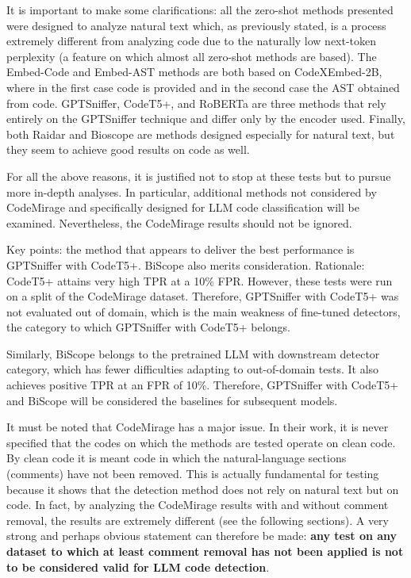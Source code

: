 It is important to make some clarifications: all the zero-shot 
methods presented were designed to analyze natural text which, 
as previously stated, is a process extremely different from 
analyzing code due to the naturally low next-token perplexity 
(a feature on which almost all zero-shot methods are based). 
The Embed-Code and Embed-AST methods are both based on 
CodeXEmbed-2B\cite{liu2024codexembed}, where in the first case code is provided and 
in the second case the AST obtained from code. GPTSniffer, 
CodeT5+, and RoBERTa are three methods that rely entirely on 
the GPTSniffer\cite{nguyen2024gptsniffer} technique and differ only by the encoder used. 
Finally, both Raidar and Bioscope are methods designed especially 
for natural text, but they seem to achieve good results on code as well.

For all the above reasons, it is justified not to stop at these tests but to pursue more in-depth analyses. In particular, additional methods not considered by CodeMirage and specifically designed for LLM code classification will be examined. Nevertheless, the CodeMirage results should not be ignored.

Key points: the method that appears to deliver the best performance 
is GPTSniffer with CodeT5+. BiScope also merits consideration. 
Rationale: CodeT5+ attains very high TPR at a 10\% 
FPR. However, these tests were run on a split of the 
CodeMirage dataset. Therefore, GPTSniffer with CodeT5+ 
was not evaluated out of domain, which is the main weakness 
of fine-tuned detectors, the category to which GPTSniffer with 
CodeT5+ belongs.

Similarly, BiScope belongs to the pretrained LLM with 
downstream detector category, which has fewer difficulties 
adapting to out-of-domain tests. It also achieves positive 
TPR at an FPR of 10\%. Therefore, GPTSniffer with 
CodeT5+ and BiScope will be considered the baselines 
for subsequent models.

It must be noted that CodeMirage has a major issue. In their work, 
it is never specified that the codes on which the methods are tested 
operate on clean code. By clean code it is meant code in which the 
natural-language sections (comments) have not been removed. 
This is actually fundamental for testing because it shows that the 
detection method does not rely on natural text but on code. In fact, 
by analyzing the CodeMirage results with and without comment removal, 
the results are extremely different (see the following sections). 
A very strong and perhaps obvious statement can therefore be made: 
\textbf{any test on any dataset to which at least comment removal has not been 
applied is not to be considered valid for LLM code detection}.




